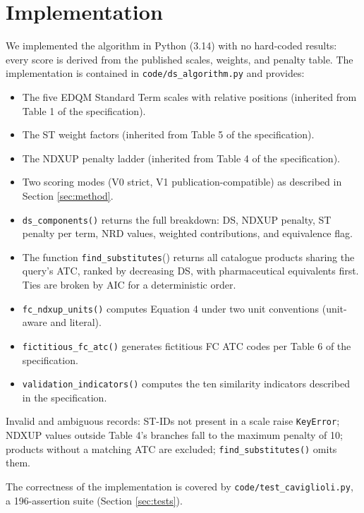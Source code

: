 \documentclass[a4paper]{elsarticle}
\begin{document}
\section{Implementation}
\label{sec:implementation}

We implemented the algorithm in Python (3.14) with no hard-coded results: every score is derived from the published scales, weights, and penalty table. The implementation is contained in \texttt{code/}\allowbreak\texttt{ds\_algorithm.py} and provides:

\begin{itemize}
\item The five EDQM Standard Term scales with relative positions (inherited from Table 1 of the specification).
\item The ST weight factors (inherited from Table 5 of the specification).
\item The NDXUP penalty ladder (inherited from Table 4 of the specification).
\item Two scoring modes (V0 strict, V1 publication-compatible) as described in Section \ref{sec:method}.
\item \texttt{ds\_components()} returns the full breakdown: DS, NDXUP penalty, ST penalty per term, NRD values, weighted contributions, and equivalence flag.
\item {\sloppy The function \mbox{\texttt{find\_substitutes}()} returns all catalogue products sharing the query's ATC, ranked by decreasing DS, with pharmaceutical equivalents first. Ties are broken by AIC for a deterministic order.}
\item \texttt{fc\_ndxup\_units()} computes Equation 4 under two unit conventions (unit-aware and literal).
\item \texttt{fictitious\_fc\_atc()} generates fictitious FC ATC codes per Table 6 of the specification.
\item \texttt{validation\_indicators()} computes the ten similarity indicators described in the specification.
\end{itemize}

Invalid and ambiguous records: ST-IDs not present in a scale raise \texttt{KeyError}; NDXUP values outside Table 4's branches fall to the maximum penalty of 10; products without a matching ATC are excluded; \mbox{\texttt{find\_substitutes()}} omits them.

The correctness of the implementation is covered by \texttt{code/test\_caviglioli.py}, a 196-assertion suite (Section \ref{sec:tests}).
\end{document}
